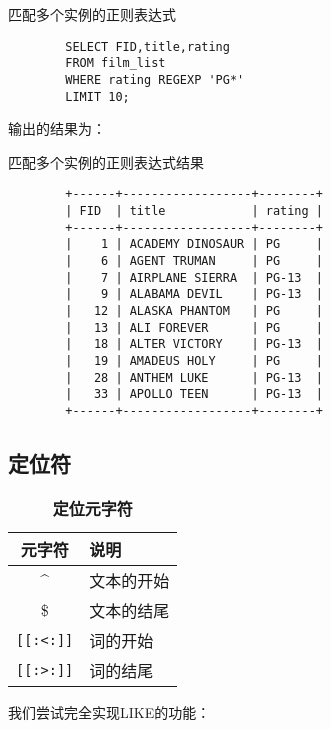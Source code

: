 \documentclass[UTF8]{article}
\begin{document}
\begin{listing}[H]
	\caption{匹配多个实例的正则表达式}
	\label{code:multimatchzhengze}
\begin{verbatim}
        SELECT FID,title,rating 
        FROM film_list  
        WHERE rating REGEXP 'PG*'  
        LIMIT 10;
\end{verbatim}
\end{listing}

输出的结果为：

\begin{listing}[H]
	\caption{匹配多个实例的正则表达式结果}
	\label{code:multimatchzhengzeresult}
\begin{verbatim}
        +------+------------------+--------+
        | FID  | title            | rating |
        +------+------------------+--------+
        |    1 | ACADEMY DINOSAUR | PG     |
        |    6 | AGENT TRUMAN     | PG     |
        |    7 | AIRPLANE SIERRA  | PG-13  |
        |    9 | ALABAMA DEVIL    | PG-13  |
        |   12 | ALASKA PHANTOM   | PG     |
        |   13 | ALI FOREVER      | PG     |
        |   18 | ALTER VICTORY    | PG-13  |
        |   19 | AMADEUS HOLY     | PG     |
        |   28 | ANTHEM LUKE      | PG-13  |
        |   33 | APOLLO TEEN      | PG-13  |
        +------+------------------+--------+
\end{verbatim}
\end{listing}

\subsection{定位符}

\begin{table}[H]
        \caption{\textbf{定位元字符}}%
        \centering%
        \begin{tabular}{cl}%
        \toprule%
        元字符 & 说明 \\
        \midrule%
        \^{} & 文本的开始 \\
        \$ & 文本的结尾 \\
        \texttt{[[:<:]]} & 词的开始 \\
        \texttt{[[:>:]]} & 词的结尾 \\
        \bottomrule%
        \end{tabular}
\end{table}

我们尝试完全实现LIKE的功能：
\end{document}
